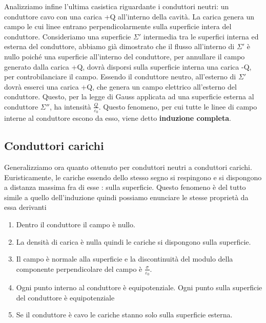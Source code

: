 \documentclass[
10pt, %
a4paper, %
oneside, %
headinclude,footinclude, %
BCOR5mm, %
]{scrartcl}
\begin{document}
Analizziamo infine l'ultima casistica riguardante i conduttori neutri: un conduttore cavo con una carica +Q all'interno della cavità. La carica genera un campo le cui linee entrano perpendicolarmente sulla superficie intera del conduttore. Consideriamo una superficie $\Sigma'$ intermedia tra le superfici interna ed esterna del conduttore, abbiamo già dimostrato che il flusso all'interno di $\Sigma'$ è nullo poiché una superficie all'interno del conduttore, per annullare il campo generato dalla carica +Q, dovrà disporsi sulla superficie interna una carica -Q, per controbilanciare il campo. Essendo il conduttore neutro, all'esterno di $\Sigma'$ dovrà esserci una carica +Q, che genera un campo elettrico all'esterno del conduttore. Questo, per la legge di Gauss applicata ad una superficie esterna al conduttore $\Sigma''$, ha intensità $\frac{Q}{\varepsilon_0}$. Questo fenomeno, per cui tutte le linee di campo interne al conduttore escono da esso, viene detto \textbf{induzione completa}.  
\subsection{Conduttori carichi}
Generalizziamo ora quanto ottenuto per conduttori neutri a conduttori carichi. Euristicamente, le cariche essendo dello stesso segno si respingono e si dispongono a distanza massima fra di esse : sulla superficie. Questo fenomeno è del tutto simile a quello dell'induzione quindi possiamo enunciare le stesse proprietà da essa derivanti
\begin{enumerate}
	\item Dentro il conduttore il campo è nullo.
	\item La densità di carica è nulla quindi le cariche si dispongono sulla superficie.
	\item Il campo è normale alla superficie e la discontinuità del modulo della componente perpendicolare del campo è $\frac{\sigma}{\varepsilon_0}$.
	\item Ogni punto interno al conduttore è equipotenziale. Ogni punto sulla superficie del conduttore è equipotenziale 
	\item Se il conduttore è cavo le cariche stanno solo sulla superficie esterna.
\end{enumerate}
\end{document}
